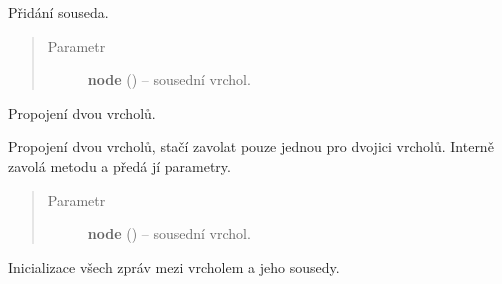\begin{fulllineitems}
\begin{fulllineitems}
\end{fulllineitems}


\begin{fulllineitems}
\label{alex.infer:alex.infer.factor.alex.infer.node.DirichletParameterNode.add_neighbor}
Přidání souseda.
\begin{quote}\begin{description}
\item[{Parametr}] \leavevmode
\textbf{node} ({\hyperref[alex.infer:alex.infer.factor.alex.infer.node.DirichletFactorNode]{}}) -- sousední vrchol.

\end{description}\end{quote}

\end{fulllineitems}


\begin{fulllineitems}
\label{alex.infer:alex.infer.factor.alex.infer.node.DirichletParameterNode.connect}
Propojení dvou vrcholů.

Propojení dvou vrcholů, stačí zavolat pouze jednou pro dvojici vrcholů.
Interně zavolá metodu {\hyperref[alex.infer:alex.infer.factor.alex.infer.node.DirichletParameterNode.add_neighbor]{}} a předá jí parametry.
\begin{quote}\begin{description}
\item[{Parametr}] \leavevmode
\textbf{node} ({\hyperref[alex.infer:alex.infer.factor.alex.infer.node.DirichletFactorNode]{}}) -- sousední vrchol.

\end{description}\end{quote}

\end{fulllineitems}


\begin{fulllineitems}
\label{alex.infer:alex.infer.factor.alex.infer.node.DirichletParameterNode.init_messages}
Inicializace všech zpráv mezi vrcholem a jeho sousedy.


\end{fulllineitems}
\end{fulllineitems}
